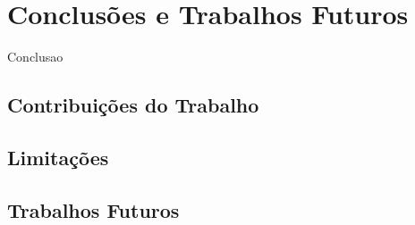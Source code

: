 \chapter{Conclusões e Trabalhos Futuros}
\label{chap:conclusoes-e-trabalhos-futuros}

Conclusao

\section{Contribuições do Trabalho}
\label{sec:contribuicoes-do-trabalho}

\section{Limitações}
\label{sec:limitacoes}

\section{Trabalhos Futuros}
\label{sec:trabalhos_futuros}
